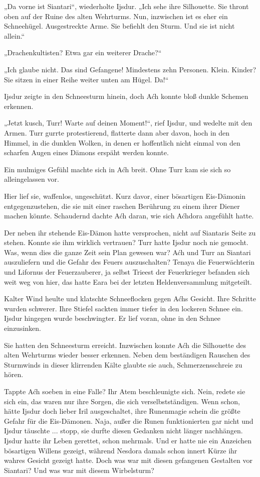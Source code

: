 „Da vorne ist Siantari“, wiederholte Ijsdur. „Ich sehe ihre Silhouette. Sie thront oben auf der Ruine des alten Wehrturms. Nun, inzwischen ist es eher ein Schneehügel. Ausgestreckte Arme. Sie befiehlt den Sturm. Und sie ist nicht allein.“

„Drachenkultisten? Etwa gar ein weiterer Drache?“

„Ich glaube nicht. Das sind Gefangene! Mindestens zehn Personen. Klein. Kinder? Sie sitzen in einer Reihe weiter unten am Hügel. Da!“

Ijsdur zeigte in den Schneesturm hinein, doch Aćh konnte bloß dunkle Schemen erkennen.

„Jetzt kusch, Turr! Warte auf deinen Moment!“, rief Ijsdur, und wedelte mit den Armen. Turr gurrte protestierend, flatterte dann aber davon, hoch in den Himmel, in die dunklen Wolken, in denen er hoffentlich nicht einmal von den scharfen Augen eines Dämons erspäht werden konnte.

Ein mulmiges Gefühl machte sich in Aćh breit. Ohne Turr kam sie sich so alleingelassen vor.

Hier lief sie, waffenlos, ungeschützt. Kurz davor, einer bösartigen Eis-Dämonin entgegenzustehen, die sie mit einer raschen Berührung zu einem ihrer Diener machen könnte. Schaudernd dachte Aćh daran, wie sich Aćhdora angefühlt hatte.

Der neben ihr stehende Eis-Dämon hatte versprochen, nicht auf Siantaris Seite zu stehen. Konnte sie ihm wirklich vertrauen? Turr hatte Ijsdur noch nie gemocht. Was, wenn dies die ganze Zeit sein Plan gewesen war? Aćh und Turr an Siantari auszuliefern und die Gefahr des Feuers auszuschalten? Tenaya die Feuerwächterin und Lifornus der Feuerzauberer, ja selbst Trieest der Feuerkrieger befanden sich weit weg von hier, das hatte Eara bei der letzten Heldenversammlung mitgeteilt.

Kalter Wind heulte und klatschte Schneeflocken gegen Aćhs Gesicht. Ihre Schritte wurden schwerer. Ihre Stiefel sackten immer tiefer in den lockeren Schnee ein. Ijsdur hingegen wurde beschwingter. Er lief voran, ohne in den Schnee einzusinken.

Sie hatten den Schneesturm erreicht. Inzwischen konnte Aćh die Silhouette des alten Wehrturms wieder besser erkennen. Neben dem beständigen Rauschen des Sturmwinds in dieser klirrenden Kälte glaubte sie auch, Schmerzensschreie zu hören.

Tappte Aćh soeben in eine Falle? Ihr Atem beschleunigte sich. Nein, redete sie sich ein, das waren nur ihre Sorgen, die sich verselbstständigen. Wenn schon, hätte Ijsdur doch lieber Iril ausgeschaltet, ihre Runenmagie schein die größte Gefahr für die Eis-Dämonen. Naja, außer die Runen funktionierten gar nicht und Ijsdur täuschte ... stopp, sie durfte diesen Gedanken nicht länger nachhängen. Ijsdur hatte ihr Leben gerettet, schon mehrmals. Und er hatte nie ein Anzeichen bösartigen Willens gezeigt, während Nesdora damals schon innert Kürze ihr wahres Gesicht gezeigt hatte. Doch was war mit diesen gefangenen Gestalten vor Siantari? Und was war mit diesem Wirbelsturm?

